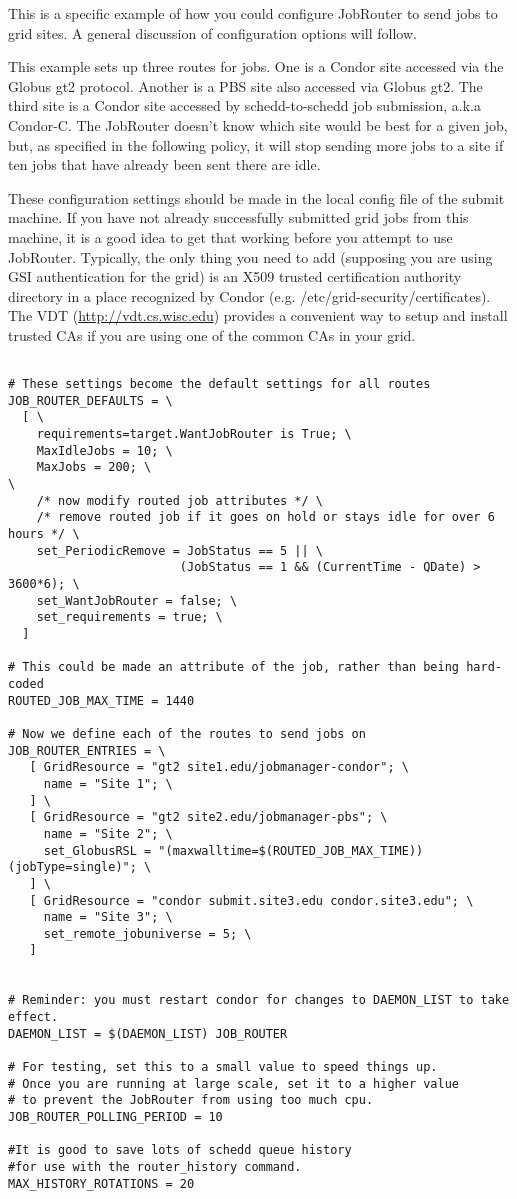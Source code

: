 This is a specific example of how you could configure JobRouter to send
jobs to grid sites.  A general discussion of configuration options
will follow.

This example sets up three routes for jobs.  One is a Condor site
accessed via the Globus gt2 protocol.  Another is a PBS site also
accessed via Globus gt2.  The third site is a Condor site accessed by
schedd-to-schedd job submission, a.k.a Condor-C.  The JobRouter
doesn't know which site would be best for a given job, but, as
specified in the following policy, it will stop sending more jobs to a
site if ten jobs that have already been sent there are idle.

These configuration settings should be made in the local config file
of the submit machine.  If you have not already successfully submitted
grid jobs from this machine, it is a good idea to get that working
before you attempt to use JobRouter.  Typically, the only thing you
need to add (supposing you are using GSI authentication for the grid)
is an X509 trusted certification authority directory in a place
recognized by Condor (e.g. /etc/grid-security/certificates).  The VDT
(\url{http://vdt.cs.wisc.edu}) provides a convenient way to setup and
install trusted CAs if you are using one of the common CAs in your
grid.

\begin{verbatim}

# These settings become the default settings for all routes
JOB_ROUTER_DEFAULTS = \
  [ \
    requirements=target.WantJobRouter is True; \
    MaxIdleJobs = 10; \
    MaxJobs = 200; \
\
    /* now modify routed job attributes */ \
    /* remove routed job if it goes on hold or stays idle for over 6 hours */ \
    set_PeriodicRemove = JobStatus == 5 || \
                        (JobStatus == 1 && (CurrentTime - QDate) > 3600*6); \
    set_WantJobRouter = false; \
    set_requirements = true; \
  ]

# This could be made an attribute of the job, rather than being hard-coded
ROUTED_JOB_MAX_TIME = 1440

# Now we define each of the routes to send jobs on
JOB_ROUTER_ENTRIES = \
   [ GridResource = "gt2 site1.edu/jobmanager-condor"; \
     name = "Site 1"; \
   ] \
   [ GridResource = "gt2 site2.edu/jobmanager-pbs"; \
     name = "Site 2"; \
     set_GlobusRSL = "(maxwalltime=$(ROUTED_JOB_MAX_TIME))(jobType=single)"; \
   ] \
   [ GridResource = "condor submit.site3.edu condor.site3.edu"; \
     name = "Site 3"; \
     set_remote_jobuniverse = 5; \
   ]


# Reminder: you must restart condor for changes to DAEMON_LIST to take effect.
DAEMON_LIST = $(DAEMON_LIST) JOB_ROUTER

# For testing, set this to a small value to speed things up.
# Once you are running at large scale, set it to a higher value
# to prevent the JobRouter from using too much cpu.
JOB_ROUTER_POLLING_PERIOD = 10

#It is good to save lots of schedd queue history
#for use with the router_history command.
MAX_HISTORY_ROTATIONS = 20
\end{verbatim}


